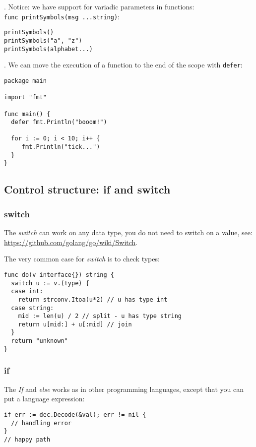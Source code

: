 \documentclass[11pt, letterpaper]{article}
\begin{document}
. Notice: we have support for variadic parameters in functions:\\ \texttt{func printSymbols(msg ...string)}:

\begin{verbatim}
printSymbols()
printSymbols("a", "z")
printSymbols(alphabet...)
\end{verbatim}

. We can move the execution of a function to the end of the scope with \verb|defer|:

\begin{verbatim}
package main

import "fmt"
  
func main() {
  defer fmt.Println("booom!")

  for i := 0; i < 10; i++ {
     fmt.Println("tick...")
  }
}
\end{verbatim}

\subsection{Control structure: if and switch}

\subsubsection{switch}

The \emph{switch} can work on any data type, you do not need to switch on a value, see: \href{Golang Wiki}{https://github.com/golang/go/wiki/Switch}.

The very common case for \emph{switch} is to check types:

\begin{verbatim}
func do(v interface{}) string {
  switch u := v.(type) {
  case int:
    return strconv.Itoa(u*2) // u has type int
  case string:
    mid := len(u) / 2 // split - u has type string
    return u[mid:] + u[:mid] // join
  }
  return "unknown"
}
\end{verbatim}

\pagebreak
\subsubsection{if}

The \emph{If} and \emph{else} works as in other programming languages, except that you can put a language expression:

\begin{verbatim}
if err := dec.Decode(&val); err != nil {
  // handling error
}
// happy path
\end{verbatim}
\end{document}
